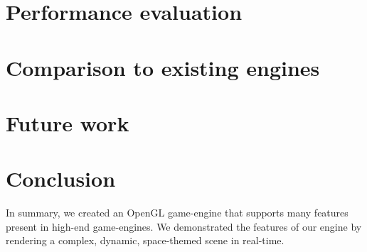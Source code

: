 \documentclass[11pt]{scrartcl} %
\begin{document}

\section{Performance evaluation}


\section{Comparison to existing engines}


\section{Future work}



\section{Conclusion}

    In summary, we created an OpenGL game-engine that supports many features
    present in high-end game-engines. We demonstrated the features of our
    engine by rendering a complex, dynamic, space-themed scene in real-time.
\end{document}
